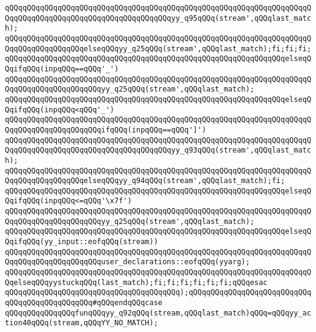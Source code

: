 \verb|qQQqqQQqqQQqqQQqqQQqqQQqqQQqqQQqqQQqqQQqqQQqqQQqqQQqqQQqqQQqqQQqqQQqqQQqqQQqqQQqqQQqqQQqqQQqqQQqqQQqqQQqqQQqyy_q95qQQq(stream',qQQqlast_match);|\newline
\verb|qQQqqQQqqQQqqQQqqQQqqQQqqQQqqQQqqQQqqQQqqQQqqQQqqQQqqQQqqQQqqQQqqQQqqQQqqQQqqQQqqQQqqQQqelseqQQqyy_q25qQQq(stream',qQQqlast_match);fi;fi;fi;|\newline
\verb|qQQqqQQqqQQqqQQqqQQqqQQqqQQqqQQqqQQqqQQqqQQqqQQqqQQqqQQqqQQqqQQqelseqQQqifqQQq(inpqQQq==qQQq'_')|\newline
\verb|qQQqqQQqqQQqqQQqqQQqqQQqqQQqqQQqqQQqqQQqqQQqqQQqqQQqqQQqqQQqqQQqqQQqqQQqqQQqqQQqqQQqqQQqqQQqyy_q25qQQq(stream',qQQqlast_match);|\newline
\verb|qQQqqQQqqQQqqQQqqQQqqQQqqQQqqQQqqQQqqQQqqQQqqQQqqQQqqQQqqQQqqQQqelseqQQqifqQQq(inpqQQq<qQQq'_')|\newline
\verb|qQQqqQQqqQQqqQQqqQQqqQQqqQQqqQQqqQQqqQQqqQQqqQQqqQQqqQQqqQQqqQQqqQQqqQQqqQQqqQQqqQQqqQQqqQQqifqQQq(inpqQQq==qQQq']')|\newline
\verb|qQQqqQQqqQQqqQQqqQQqqQQqqQQqqQQqqQQqqQQqqQQqqQQqqQQqqQQqqQQqqQQqqQQqqQQqqQQqqQQqqQQqqQQqqQQqqQQqqQQqqQQqqQQqyy_q93qQQq(stream',qQQqlast_match);|\newline
\verb|qQQqqQQqqQQqqQQqqQQqqQQqqQQqqQQqqQQqqQQqqQQqqQQqqQQqqQQqqQQqqQQqqQQqqQQqqQQqqQQqqQQqqQQqelseqQQqyy_q94qQQq(stream',qQQqlast_match);fi;|\newline
\verb|qQQqqQQqqQQqqQQqqQQqqQQqqQQqqQQqqQQqqQQqqQQqqQQqqQQqqQQqqQQqqQQqelseqQQqifqQQq(inpqQQq<=qQQq'\x7f')|\newline
\verb|qQQqqQQqqQQqqQQqqQQqqQQqqQQqqQQqqQQqqQQqqQQqqQQqqQQqqQQqqQQqqQQqqQQqqQQqqQQqqQQqqQQqqQQqqQQqyy_q25qQQq(stream',qQQqlast_match);|\newline
\verb|qQQqqQQqqQQqqQQqqQQqqQQqqQQqqQQqqQQqqQQqqQQqqQQqqQQqqQQqqQQqqQQqelseqQQqifqQQq(yy_input::eofqQQq(stream))|\newline
\verb|qQQqqQQqqQQqqQQqqQQqqQQqqQQqqQQqqQQqqQQqqQQqqQQqqQQqqQQqqQQqqQQqqQQqqQQqqQQqqQQqqQQqqQQqqQQquser_declarations::eofqQQq(yyarg);|\newline
\verb|qQQqqQQqqQQqqQQqqQQqqQQqqQQqqQQqqQQqqQQqqQQqqQQqqQQqqQQqqQQqqQQqqQQqqQQqelseqQQqyystuckqQQq(last_match);fi;fi;fi;fi;fi;fi;qQQqesac|\newline
\verb|qQQqqQQqqQQqqQQqqQQqqQQqqQQqqQQqqQQqqQQq);qQQqqQQqqQQqqQQqqQQqqQQqqQQqqQQqqQQqqQQqqQQqqQQq#qQQqendqQQqcase|\newline
\verb|qQQqqQQqqQQqqQQqfunqQQqyy_q92qQQq(stream,qQQqlast_match)qQQq=qQQqyy_action40qQQq(stream,qQQqYY_NO_MATCH);|\newline
